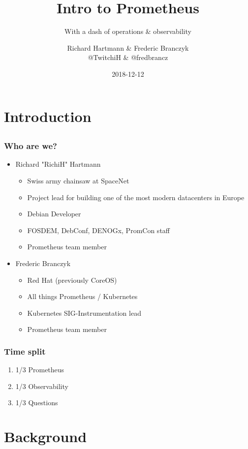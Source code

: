 \documentclass[aspectratio=169]{beamer}
\title{Intro to Prometheus}
\subtitle{With a dash of operations \& observability}
\author{Richard Hartmann \& Frederic Branczyk\\
@TwitchiH \& @fredbrancz}
\date{2018-12-12}
\begin{document}
\section{Introduction}

\subsection{}

\begin{frame}
	\titlepage
\end{frame}

\begin{frame}
	\frametitle{Who are we?}
	\begin{itemize}
		\item Richard "RichiH" Hartmann
		\begin{itemize}
			\item Swiss army chainsaw at SpaceNet
			\item Project lead for building one of the most modern datacenters in Europe
			\item Debian Developer
			\item FOSDEM, DebConf, DENOGx, PromCon staff
			\item Prometheus team member
		\end{itemize}
		\item Frederic Branczyk
		\begin{itemize}
			\item Red Hat (previously CoreOS)
			\item All things Prometheus / Kubernetes
			\item Kubernetes SIG-Instrumentation lead
			\item Prometheus team member
		\end{itemize}
	\end{itemize}
\end{frame}

\begin{frame}
	\frametitle{Time split}
	\begin{enumerate}
		\item 1/3 Prometheus
		\item 1/3 Observability
		\item 1/3 Questions
	\end{enumerate}
\end{frame}



\section{Background}
\end{document}

